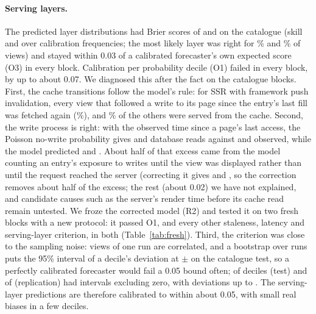 \documentclass[acmsmall,review,nonacm]{acmart}
\begin{document}
\paragraph{Serving layers.}
The predicted layer distributions had Brier scores of \revTBrier{} and \revRBrier{} on the catalogue (skill \revTSkill{} and \revRSkill{} over calibration frequencies; the most likely layer was right for \revTTop\% and \revRTop\% of views) and stayed within 0.03 of a calibrated forecaster's own expected score (O3) in every block. Calibration per probability decile (O1) failed in every block, by up to about 0.07. We diagnosed this after the fact on the catalogue blocks. First, the cache transitions follow the model's rule: for SSR with framework push invalidation, every view that followed a write to its page since the entry's last fill was fetched again (\diagPushTWriteFetched\%), and \diagPushTNoWriteCache\% of the others were served from the cache. Second, the write process is right: with the observed time since a page's last access, the Poisson no-write probability gives \diagPushTFormula{} and \diagPushRFormula{} database reads against \diagPushTObs{} and \diagPushRObs{} observed, while the model predicted \diagPushTPredR{} and \diagPushRPredR. About half of that excess came from the model counting an entry's exposure to writes until the view was displayed rather than until the request reached the server (correcting it gives \diagPushTPredRtwo{} and \diagPushRPredRtwo{}, so the correction removes about half of the excess; the rest (about 0.02) we have not explained, and candidate causes such as the server's render time before its cache read remain untested. We froze the corrected model (R2) and tested it on two fresh blocks with a new protocol: it passed O1, and every other staleness, latency and serving-layer criterion, in both (Table~\ref{tab:fresh}). Third, the criterion was close to the sampling noise: views of one run are correlated, and a bootstrap over runs puts the 95\% interval of a decile's deviation at $\pm$\diagNoiseTHalf{} on the catalogue test, so a perfectly calibrated forecaster would fail a 0.05 bound often; \diagNoiseTExcl{} of \diagNoiseTDeciles{} deciles (test) and \diagNoiseRExcl{} of \diagNoiseRDeciles{} (replication) had intervals excluding zero, with deviations up to \diagNoiseTMaxExcl. The serving-layer predictions are therefore calibrated to within about 0.05, with small real biases in a few deciles.
\end{document}
